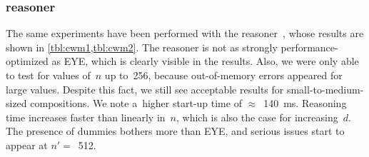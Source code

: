 \vspace{-1em}

\subsubsection{\cwm reasoner}
The same experiments have been performed with the \cwm reasoner~\cite{cwm},
whose results are shown in \cref{tbl:cwm1,tbl:cwm2}.
The \cwm reasoner is not as strongly performance-optimized as EYE,
which is clearly visible in the results.
Also, we were only able to test for values of~$n$ up to~256,
because out-of-memory errors appeared for large values.
Despite this fact, we still see acceptable results for small-to-medium-sized compositions.
We note a~higher start-up time of $\approx$~140~ms.
Reasoning time increases faster than linearly in~$n$,
which is also the case for increasing~$d$.
The presence of dummies bothers \cwm more than EYE,
and serious issues start to appear at $n'=$~512.

